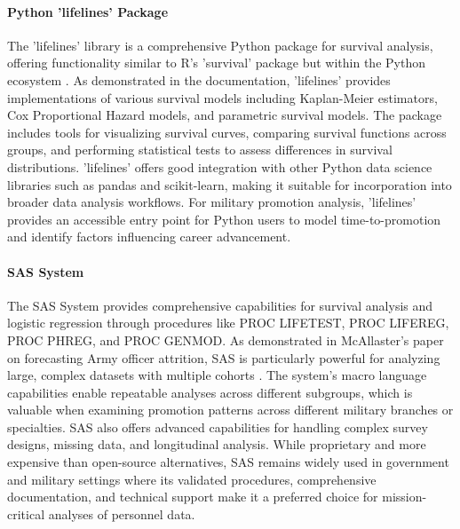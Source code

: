 \documentclass[../main.tex]{subfiles}
\begin{document}
\paragraph{Python 'lifelines' Package}
The 'lifelines' library is a comprehensive Python package for survival analysis, offering functionality similar to R's 'survival' package but within the Python ecosystem \citep{lifelines}. As demonstrated in the documentation, 'lifelines' provides implementations of various survival models including Kaplan-Meier estimators, Cox Proportional Hazard models, and parametric survival models. The package includes tools for visualizing survival curves, comparing survival functions across groups, and performing statistical tests to assess differences in survival distributions. 'lifelines' offers good integration with other Python data science libraries such as pandas and scikit-learn, making it suitable for incorporation into broader data analysis workflows. For military promotion analysis, 'lifelines' provides an accessible entry point for Python users to model time-to-promotion and identify factors influencing career advancement.

\paragraph{SAS System}
The SAS System provides comprehensive capabilities for survival analysis and logistic regression through procedures like PROC LIFETEST, PROC LIFEREG, PROC PHREG, and PROC GENMOD. As demonstrated in McAllaster's paper on forecasting Army officer attrition, SAS is particularly powerful for analyzing large, complex datasets with multiple cohorts \citep{mcallaster1999}. The system's macro language capabilities enable repeatable analyses across different subgroups, which is valuable when examining promotion patterns across different military branches or specialties. SAS also offers advanced capabilities for handling complex survey designs, missing data, and longitudinal analysis. While proprietary and more expensive than open-source alternatives, SAS remains widely used in government and military settings where its validated procedures, comprehensive documentation, and technical support make it a preferred choice for mission-critical analyses of personnel data.
\end{document}
